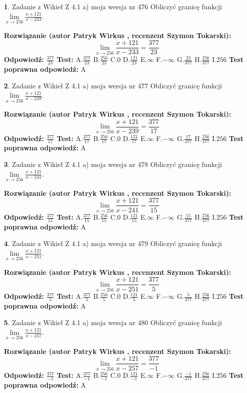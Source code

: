 \documentclass[12pt, a4paper]{article}
\theoremstyle{definition} %
\newtheorem{zad}{}
\newcommand{\zadStart}[1]{\begin{zad}#1\newline}
\newcommand{\zadStop}{\end{zad}}
\newcommand{\rozwStart}[2]{\noindent \textbf{Rozwiązanie (autor #1 , recenzent #2): }\newline}
\newcommand{\rozwStop}{\newline}
\newcommand{\odpStart}{\noindent \textbf{Odpowiedź:}\newline}
\newcommand{\odpStop}{\newline}
\newcommand{\testStart}{\noindent \textbf{Test:}\newline}
\newcommand{\testStop}{\newline}
\newcommand{\kluczStart}{\noindent \textbf{Test poprawna odpowiedź:}\newline}
\newcommand{\kluczStop}{\newline}
\begin{document}
\zadStart{Zadanie z Wikieł Z 4.1 a) moja wersja nr 476}
Obliczyć granicę funkcji $\lim\limits_{x\to256}\frac{x+121}{x-233}$.
\zadStop
\rozwStart{Patryk Wirkus}{Szymon Tokarski}
$$\lim\limits_{x\to256}\frac{x+121}{x-233} = \frac{377}{23}$$
\rozwStop
\odpStart
$\frac{377}{23}$
\odpStop
\testStart
A.$\frac{377}{23}$
B.$\frac{256}{23}$
C.$0$
D.$\frac{121}{23}$
E.$\infty$
F.$-\infty$
G.$\frac{23}{377}$
H.$\frac{256}{377}$
I.$256$
\testStop
\kluczStart
A
\kluczStop



\zadStart{Zadanie z Wikieł Z 4.1 a) moja wersja nr 477}
Obliczyć granicę funkcji $\lim\limits_{x\to256}\frac{x+121}{x-239}$.
\zadStop
\rozwStart{Patryk Wirkus}{Szymon Tokarski}
$$\lim\limits_{x\to256}\frac{x+121}{x-239} = \frac{377}{17}$$
\rozwStop
\odpStart
$\frac{377}{17}$
\odpStop
\testStart
A.$\frac{377}{17}$
B.$\frac{256}{17}$
C.$0$
D.$\frac{121}{17}$
E.$\infty$
F.$-\infty$
G.$\frac{17}{377}$
H.$\frac{256}{377}$
I.$256$
\testStop
\kluczStart
A
\kluczStop



\zadStart{Zadanie z Wikieł Z 4.1 a) moja wersja nr 478}
Obliczyć granicę funkcji $\lim\limits_{x\to256}\frac{x+121}{x-241}$.
\zadStop
\rozwStart{Patryk Wirkus}{Szymon Tokarski}
$$\lim\limits_{x\to256}\frac{x+121}{x-241} = \frac{377}{15}$$
\rozwStop
\odpStart
$\frac{377}{15}$
\odpStop
\testStart
A.$\frac{377}{15}$
B.$\frac{256}{15}$
C.$0$
D.$\frac{121}{15}$
E.$\infty$
F.$-\infty$
G.$\frac{15}{377}$
H.$\frac{256}{377}$
I.$256$
\testStop
\kluczStart
A
\kluczStop



\zadStart{Zadanie z Wikieł Z 4.1 a) moja wersja nr 479}
Obliczyć granicę funkcji $\lim\limits_{x\to256}\frac{x+121}{x-251}$.
\zadStop
\rozwStart{Patryk Wirkus}{Szymon Tokarski}
$$\lim\limits_{x\to256}\frac{x+121}{x-251} = \frac{377}{5}$$
\rozwStop
\odpStart
$\frac{377}{5}$
\odpStop
\testStart
A.$\frac{377}{5}$
B.$\frac{256}{5}$
C.$0$
D.$\frac{121}{5}$
E.$\infty$
F.$-\infty$
G.$\frac{5}{377}$
H.$\frac{256}{377}$
I.$256$
\testStop
\kluczStart
A
\kluczStop



\zadStart{Zadanie z Wikieł Z 4.1 a) moja wersja nr 480}
Obliczyć granicę funkcji $\lim\limits_{x\to256}\frac{x+121}{x-257}$.
\zadStop
\rozwStart{Patryk Wirkus}{Szymon Tokarski}
$$\lim\limits_{x\to256}\frac{x+121}{x-257} = \frac{377}{-1}$$
\rozwStop
\odpStart
$\frac{377}{-1}$
\odpStop
\testStart
A.$\frac{377}{-1}$
B.$\frac{256}{-1}$
C.$0$
D.$\frac{121}{-1}$
E.$\infty$
F.$-\infty$
G.$\frac{-1}{377}$
H.$\frac{256}{377}$
I.$256$
\testStop
\kluczStart
A
\kluczStop
\end{document}
